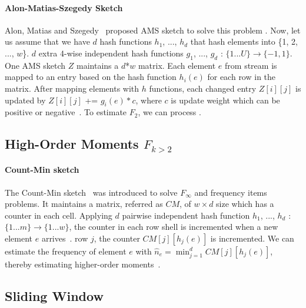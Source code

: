 \paragraph{Alon-Matias-Szegedy Sketch}
Alon, Matias and Szegedy~\cite{alon1999space} proposed AMS sketch to solve this
problem . Now, let us assume that we have $d$ hash functions $h_1$, ..., $h_d$
that hash elements into \{1, 2, ..., $w$\}. $d$ extra 4-wise independent hash
functions $g_1$, ..., $g_d$ : $\{1...U\}\rightarrow \{-1, 1\}$. One AMS sketch
$Z$ maintains a $d$*$w$ matrix. Each element $e$ from stream is mapped to an
entry based on the hash function $h_i(e)$ for each row in the matrix. After
mapping elements with $h$ functions, each changed entry $Z[i][j]$ is updated by
$Z[i][j]$ += $g_i(e)*c$, where $c$ is update weight which can be positive or
negative~\cite{garofalakis2016data}. To estimate $F_2$, we can process
.

\subsection{High-Order Moments $F_{k>2}$}
\paragraph{Count-Min sketch}
The Count-Min sketch~\cite{cormode2005improved} was introduced to solve
$F_\infty$ and frequency items problems. It maintains a matrix, referred  as
$CM$, of $w \times d$ size which has a counter in each cell. Applying $d$ pairwise
independent hash function $h_1$, ..., $h_d$ : $\{1...m\} \rightarrow \{1...w\}$,
the counter in each row shell  is incremented when a new element $e$
arrives~\cite{garofalakis2016data}.  row $j$, the counter
$CM[j][h_j(e)]$ is incremented. We can estimate the frequency of element $e$ with
$\hat{n}_e = \min_{j=1}^d CM[j][h_j(e)]$, thereby estimating higher-order
moments~\cite{cormode2005improved}.



\subsection{Sliding Window}

